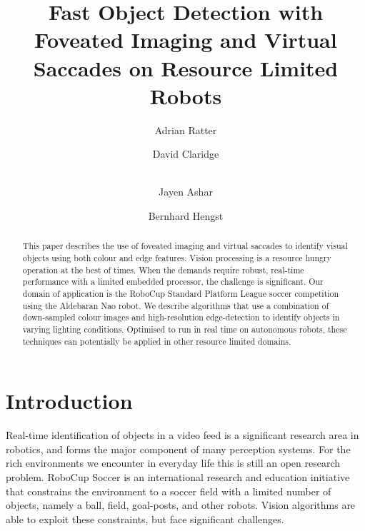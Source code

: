 \documentclass[runningheads,a4paper]{llncs}
\begin{document}
\mainmatter

\title{Fast Object Detection with Foveated Imaging and Virtual Saccades on Resource Limited Robots}


\author{Adrian Ratter \and David Claridge\and \\
    Jayen  Ashar \and Bernhard Hengst}



\maketitle


\begin{abstract}
This paper describes the use of foveated imaging and virtual saccades to
identify visual objects using both colour and edge features. Vision processing
is a resource hungry operation at the best of times. When the demands require
robust, real-time performance with a limited embedded processor, the challenge
is significant. Our domain of application is the RoboCup Standard Platform
League soccer competition using the Aldebaran Nao robot. We describe algorithms
that use a combination of down-sampled colour images and high-resolution
edge-detection to identify objects in varying lighting conditions. Optimised to
run in real time on autonomous robots, these techniques can potentially be
applied in other resource limited domains. 
\end{abstract}


\section{Introduction}

Real-time identification of objects in a video feed is a significant research
area in robotics, and forms the major component of many perception systems. For
the rich environments we encounter in everyday life this is still an open
research problem.  RoboCup Soccer\cite{robocupurl} is an international research
and education initiative that constrains the environment to a soccer field with
a limited number of objects, namely a ball, field, goal-posts, and other
robots. Vision algorithms are able to exploit these constraints, but face
significant challenges.
\end{document}

